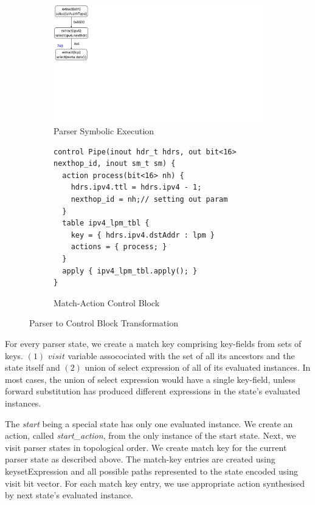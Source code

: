 \documentclass{hotnets19}
\begin{document}
\begin{figure}[!h]
\begin{subfigure}[b]{0.3\linewidth}
        \includegraphics[trim=4 285 796 0, clip,scale=0.4]{parser-example-se-2}
        \caption{Parser Symbolic Execution}
        \label{subfig:parser-symbolic-execution}
    \end{subfigure}
    \begin{subfigure}[b]{.4\linewidth}
\begin{lstlisting}[frame=none]
control Pipe(inout hdr_t hdrs, out bit<16> nexthop_id, inout sm_t sm) {
  action process(bit<16> nh) {
    hdrs.ipv4.ttl = hdrs.ipv4 - 1;
    nexthop_id = nh;// setting out param
  }
  table ipv4_lpm_tbl {
    key = { hdrs.ipv4.dstAddr : lpm } 
    actions = { process; }
  }
  apply { ipv4_lpm_tbl.apply(); }
}
\end{lstlisting}
\caption{Match-Action Control Block}
\label{subfig:parser-symbolic-execution}
\end{subfigure}
\caption{Parser to Control Block Transformation}
\label{fig:parser-to-control-block-transformation}
\end{figure}

For every parser state, we create a match key comprising key-fields from sets of keys. 
$(1)$ $visit$ variable assocociated with the set of all its ancestors and the state itself and
$(2)$ union of select expression of all of its evaluated instances.
In most cases, the union of select expression would have a single key-field, unless forward substitution has produced different expressions in the state's evaluated instances.

The \emph{start} being a special state has only one evaluated instance.
We create an action, called \emph{start\_action}, from the only instance of the start state.
Next, we visit parser states in topological order. 
We create match key for the current parser state as described above.
The match-key entries are created using keysetExpression and all possible paths represented to the state encoded using visit bit vector.
For each match key entry, we use appropriate action synthesised by next state's evaluated instance.
\end{document}
